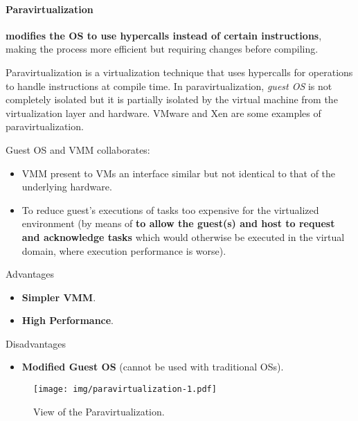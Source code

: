 \longline

\paragraph{Paravirtualization}

 \textbf{modifies the OS to use hypercalls instead of certain instructions}, making the process more efficient but requiring changes before compiling.

\highspace
Paravirtualization is a virtualization technique that uses hypercalls for operations to handle instructions at compile time. In paravirtualization, \emph{guest OS} is not completely isolated but it is partially isolated by the virtual machine from the virtualization layer and hardware. VMware and Xen are some examples of paravirtualization.

\highspace
Guest OS and VMM collaborates:
\begin{itemize}
	\item VMM present to VMs an interface similar but not identical to that of the underlying hardware.
	\item To reduce guest's executions of tasks too expensive for the virtualized environment (by means of \textbf{ to allow the guest(s) and host to request and acknowledge tasks} which would otherwise be executed in the virtual domain, where execution performance is worse).
\end{itemize}

\highspace
\begin{flushleft}
	\textcolor{Green3}{ Advantages}
\end{flushleft}
\begin{itemize}
	\item \textbf{Simpler VMM}.
	\item \textbf{High Performance}.
\end{itemize}

\begin{flushleft}
	\textcolor{Red2}{ Disadvantages}
\end{flushleft}
\begin{itemize}
	\item \textbf{Modified Guest OS} (cannot be used with traditional OSs).
\end{itemize}

\newpage

\begin{figure}[!htp]
	\centering
	\texttt{[image: img/paravirtualization-1.pdf]}
	\caption{View of the Paravirtualization.}
\end{figure}

